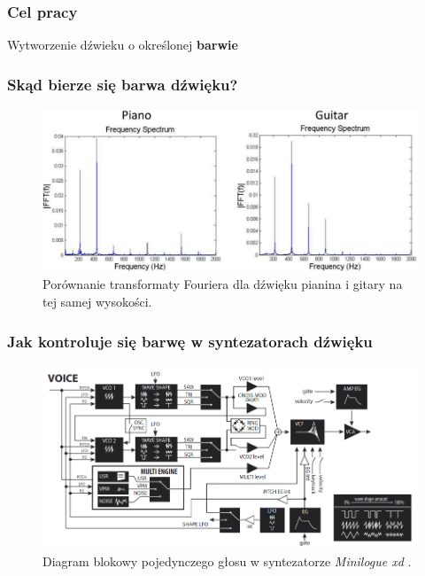\documentclass[]{beamer}
\begin{document}
\begin{frame}
  \frametitle{Cel pracy}

  \centering
  \Large
  Wytworzenie dźwieku o określonej \textbf{barwie}
\end{frame}


\begin{frame}
  \frametitle{Skąd bierze się \textbf{barwa} dźwięku?}
  \begin{figure}
    \centering
    \includegraphics[width=0.9\linewidth]{piano_guitar_fourier.png}
    \caption{Porównanie transformaty Fouriera dla dźwięku pianina i gitary na tej samej wysokości.}
  \end{figure}
\end{frame}


\begin{frame}
  \frametitle{Jak kontroluje się barwę w syntezatorach dźwięku}

  \begin{figure}
    \centering
    \includegraphics[width=0.9\linewidth]{minilogue_voice_block_diagram.png}

    \caption{
      Diagram blokowy pojedynczego głosu w syntezatorze 
      \textit{Minilogue xd} \cite{minilogue_diagram}.
    }
  \end{figure}
\end{frame}
\end{document}
